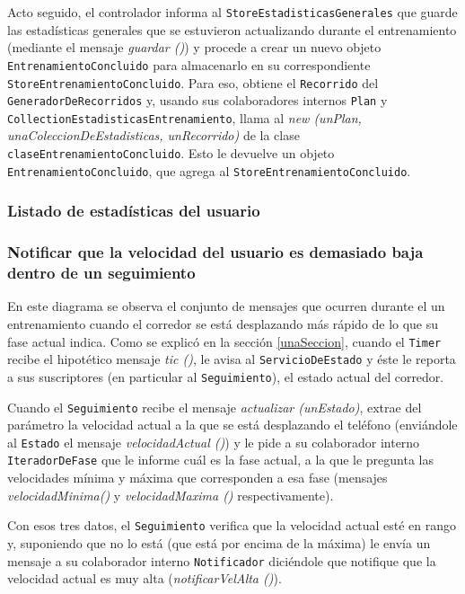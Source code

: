 Acto seguido, el controlador informa al \texttt{StoreEstadisticasGenerales} que guarde las estadísticas generales que se estuvieron actualizando durante el entrenamiento (mediante el mensaje \emph{guardar ()}) y procede a crear un nuevo objeto \texttt{EntrenamientoConcluido} para almacenarlo en su correspondiente \texttt{StoreEntrenamientoConcluido}. Para eso, obtiene el \texttt{Recorrido} del \texttt{GeneradorDeRecorridos} y, usando sus colaboradores internos \texttt{Plan} y \texttt{CollectionEstadisticasEntrenamiento}, llama al \emph{new (unPlan, unaColeccionDeEstadisticas, unRecorrido)} de la clase \texttt{claseEntrenamientoConcluido}. Esto le devuelve un objeto \texttt{EntrenamientoConcluido}, que agrega al \texttt{StoreEntrenamientoConcluido}.

\subsubsection{Listado de estadísticas del usuario}

\subsubsection{Notificar que la velocidad del usuario es demasiado baja dentro de un seguimiento}

En este diagrama se observa el conjunto de mensajes que ocurren durante el un entrenamiento cuando el corredor se está desplazando más rápido de lo que su fase actual indica. Como se explicó en la sección \ref{unaSeccion}, cuando el \texttt{Timer} recibe el hipotético mensaje \emph{tic ()}, le avisa al \texttt{ServicioDeEstado} y éste le reporta a sus suscriptores (en particular al \texttt{Seguimiento}), el estado actual del corredor.

Cuando el \texttt{Seguimiento} recibe el mensaje \emph{actualizar (unEstado)}, extrae del parámetro la velocidad actual a la que se está desplazando el teléfono (enviándole al \texttt{Estado} el mensaje \emph{velocidadActual ()}) y le pide a su colaborador interno \texttt{IteradorDeFase} que le informe cuál es la fase actual, a la que le pregunta las velocidades mínima y máxima que corresponden a esa fase (mensajes \emph{velocidadMinima()} y \emph{velocidadMaxima ()} respectivamente).

Con esos tres datos, el \texttt{Seguimiento} verifica que la velocidad actual esté en rango y, suponiendo que no lo está (que está por encima de la máxima) le envía un mensaje a su colaborador interno \texttt{Notificador} diciéndole que notifique que la velocidad actual es muy alta (\emph{notificarVelAlta ()}). 

